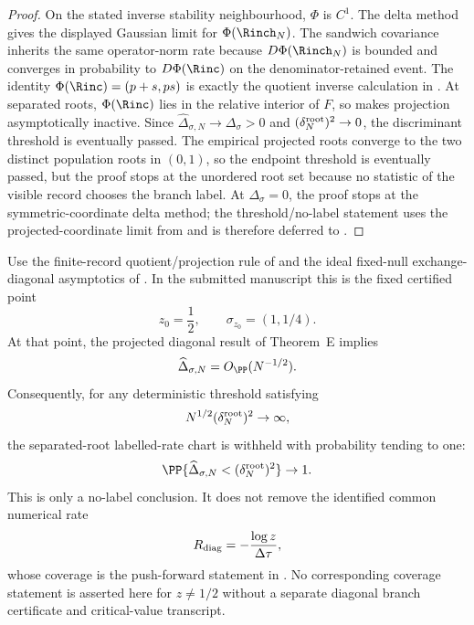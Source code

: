 \begin{proof}
On the stated inverse stability neighbourhood, \(\Phi\) is \(C^1\).  The delta
method gives the displayed Gaussian limit for \(\Phi(\Rinch_N)\).  The
sandwich covariance inherits the same operator-norm rate because
\(D\Phi(\Rinch_N)\) is bounded and converges in probability to \(D\Phi(\Rinc)\)
on the denominator-retained event.  The identity \(\Phi(\Rinc)=(p+s,ps)\) is
exactly the quotient inverse calculation in
.  At separated roots,
\(\Phi(\Rinc)\) lies in the relative interior of \(F\), so
 makes projection
asymptotically inactive.  Since
\(\widehat\Delta_{\sigma,N}\to\Delta_\sigma>0\) and
\((\delta_N^{\rm root})^2\to0\), the
discriminant threshold is eventually passed.  The empirical projected roots
converge to the two distinct population roots in \((0,1)\), so the endpoint
threshold is eventually passed, but the proof stops at the unordered root set
because no statistic of the visible record chooses the branch label.  At
\(\Delta_\sigma=0\), the proof stops at the symmetric-coordinate delta method;
the threshold/no-label statement uses the projected-coordinate limit from
 and is therefore deferred to
.
\end{proof}

\iffalse %
\begin{corollary}\label{cor:post-diagonal-no-label-reporting-main}
Use the finite-record quotient/projection rule of
 and the
ideal fixed-null exchange-diagonal asymptotics of
.  In the submitted
manuscript this is the fixed certified point
\[
z_0=\frac12,\qquad \sigma_{z_0}=(1,1/4).
\]
At that point, the projected diagonal result of Theorem~E implies
\[
\widehat\Delta_{\sigma,N}=O_{\PP}(N^{-1/2}).
\]
Consequently, for any deterministic threshold satisfying
\[
N^{1/2}(\delta_N^{\rm root})^2\to\infty,
\]
the separated-root labelled-rate chart is withheld with probability tending to
one:
\[
\PP\{\widehat\Delta_{\sigma,N}<(\delta_N^{\rm root})^2\}\to1 .
\]
This is only a no-label conclusion.  It does not remove the identified common
numerical rate
\[
R_{\rm diag}=-\frac{\log z}{\Delta\tau},
\]
whose coverage is the push-forward statement in
.
No corresponding coverage statement is asserted here for \(z\ne1/2\) without
a separate diagonal branch certificate and critical-value transcript.
\end{corollary}

